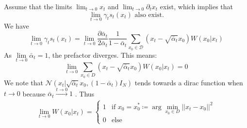 \documentclass[a4paper,10pt]{article}
\theoremstyle{definition} %
\theoremstyle{definition} %
\theoremstyle{definition} %
\theoremstyle{definition} %
\newcommand{\0}{\boldsymbol{0}}
\begin{document}
Assume that the limits \( \lim_{t \to 0} x_t \) and \( \lim_{t \to 0} \partial_t x_t \) exist, which implies that
\[
\lim_{t \to 0} \gamma_t s_t(x_t) \text{ also exist.}
\]
We have
\begin{equation*}
    \lim\limits_{t \to 0} \gamma_t s_t (x_t) = \lim\limits_{t \to 0} \frac{\partial \bar{\alpha}_t}{2\bar{\alpha}_t} \frac{1}{1 - \bar{\alpha}_t} \sum\limits_{x_0 \in \mathcal{D}} \left( x_t - \sqrt{\bar{\alpha}_t} x_0 \right) W(x_0 | x_t)
\end{equation*}
As  $\lim\limits_{t \to 0} \bar{\alpha}_t = 1$, the prefactor diverges. This means:
\begin{equation*}
    \lim\limits_{t \to 0} \sum\limits_{x_0 \in D} (x_t - \sqrt{\bar{\alpha}_t} x_0) W(x_0 | x_t) = 0
\end{equation*}
We note that $\mathcal{N}(x_t | \sqrt{\bar{\alpha}_t} x_0, (1 - \bar{\alpha}_t) I_N)$ tends towards a dirac function when $t \to 0$ because $\bar{\alpha}_t \xrightarrow[]{t \to 0} 1$ . Thus
\begin{equation*}
    \lim\limits_{t \to 0} W(x_0 | x_t) =
\begin{cases} 
1 & \text{if } x_0 = x_0^* \coloneq \arg\min_{x_0 \in D} ||x_t - x_0||^2 \\
0 & \text{else}
\end{cases}
\end{equation*}
\end{document}
